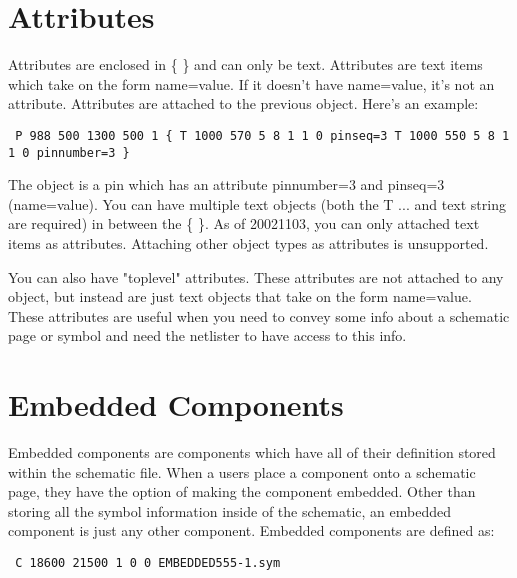 \documentclass{article}
\begin{document}
\section{Attributes}

Attributes are enclosed in \{ \} and can only be text.  Attributes are text
items which take on the form name=value.  If it doesn't have name=value,
it's not an attribute.  Attributes are attached to the previous object.
Here's an example:
       
{\tt 
P 988 500 1300 500 1\newline
\{\newline
T 1000 570 5 8 1 1 0\newline
pinseq=3\newline
T 1000 550 5 8 1 1 0\newline
pinnumber=3\newline
\}\newline
}

        The object is a pin which has an attribute pinnumber=3 and
pinseq=3 (name=value).  You can have multiple text objects (both the T
... and text string are required) in between the \{ \}.  As of 20021103,
you can only attached text items as attributes.  Attaching other object
types as attributes is unsupported.

        You can also have "toplevel" attributes.  These attributes are not
attached to any object, but instead are just text objects that take
on the form name=value.  These attributes are useful when you need to
convey some info about a schematic page or symbol and need the netlister
to have access to this info.


\section{Embedded Components}

	Embedded components are components which have all of their definition
stored within the schematic file.  When a users place a component onto a
schematic page, they have the option of making the component embedded.  Other
than storing all the symbol information inside of the schematic, an embedded
component is just any other component.  Embedded components are defined as:

{\tt
C 18600 21500 1 0 0 EMBEDDED555-1.sym  \newline
}
\end{document}
